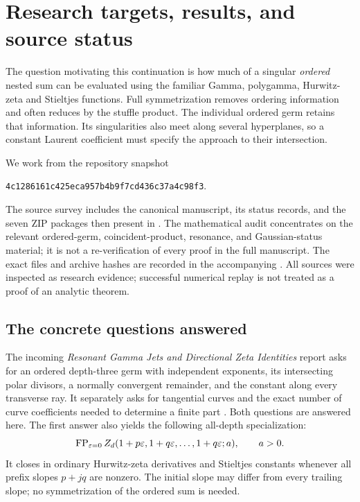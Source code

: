 \section{Research targets, results, and source status}
\label{sec:scope}

The question motivating this continuation is how much of a singular
\emph{ordered} nested sum can be evaluated using the familiar Gamma,
polygamma, Hurwitz-zeta and Stieltjes functions. Full symmetrization
removes ordering information and often reduces by the stuffle product.
The individual ordered germ retains that information. Its singularities
also meet along several hyperplanes, so a constant Laurent coefficient
must specify the approach to their intersection.

We work from the repository snapshot
\begin{center}
\small\texttt{4c1286161c425eca957b4b9f7cd436c37a4c98f3}.
\end{center}
The source survey includes the canonical manuscript, its status records,
and the seven ZIP packages then present in . The
mathematical audit concentrates on the relevant ordered-germ,
coincident-product, resonance, and Gaussian-status material; it is
not a re-verification of every proof in the full manuscript.
The exact files and archive hashes are recorded in the accompanying
. All sources were inspected as
research evidence; successful numerical replay is not treated as a
proof of an analytic theorem.

\subsection{The concrete questions answered}

The incoming \emph{Resonant Gamma Jets and Directional Zeta Identities}
report asks for an ordered depth-three germ with independent exponents,
its intersecting polar divisors, a normally convergent remainder, and
the constant along every transverse ray. It separately asks for
tangential curves and the exact number of curve coefficients needed
to determine a finite part \cite[Further research, Q1 and Q3]{repojets}.
Both questions are answered here. The first answer also yields the
following all-depth specialization:
\begin{equation}\label{scope:mainfamily}
 \operatorname{FP}_{\varepsilon=0}Z_d(1+p\varepsilon,1+q\varepsilon,\ldots,1+q\varepsilon;a),
 \qquad a>0.
\end{equation}
It closes in ordinary Hurwitz-zeta derivatives and Stieltjes constants
whenever all prefix slopes $p+jq$ are nonzero. The initial slope may
differ from every trailing slope; no symmetrization of the ordered sum
is needed.

